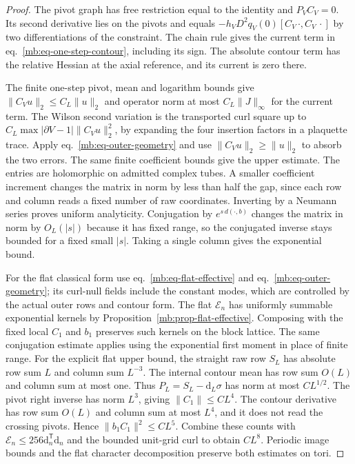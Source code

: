 \documentclass[11pt,letterpaper,reqno]{amsart}
\numberwithin{equation}{section}
\renewcommand{\eqref}[1]{\textup{eq.~\ref{#1}}}
\theoremstyle{definition}
\theoremstyle{remark}
\begin{document}
\begin{proof}
The pivot graph has free restriction equal to the identity and
\(P_V C_V=0\). Its second derivative lies on the pivots and
equals \(-h_VD^2q_V(0)[C_V\,\cdot,C_V\,\cdot]\) by two
differentiations of the constraint. The chain rule gives the
current term in \eqref{mb:eq-one-step-contour}, including its
sign. The absolute contour term has the relative Hessian at
the axial reference, and its current is zero there.

The finite one-step pivot, mean and logarithm bounds give
\(\|C_Vu\|_2\le C_L\|u\|_2\) and operator norm at most
\(C_L\|J\|_\infty\) for the current term. The Wilson second
variation is the transported curl square up to
\(C_L\max|\partial V-1|\|C_Vu\|_2^2\), by expanding the
four insertion factors in a plaquette trace. Apply
\eqref{mb:eq-outer-geometry} and use
\(\|C_Vu\|_2\ge\|u\|_2\) to absorb the two errors. The
same finite coefficient bounds give the upper estimate.
The entries are holomorphic on admitted complex tubes.
A smaller coefficient increment changes the matrix in norm
by less than half the gap, since each row and column reads a
fixed number of raw coordinates. Inverting by a Neumann
series proves uniform analyticity. Conjugation by
\(e^{s\,d(\cdot,b)}\) changes the matrix in norm by \(O_L(|s|)\)
because it has fixed range, so the conjugated inverse stays
bounded for a fixed small \(|s|\). Taking a single column
gives the exponential bound.

For the flat classical form use \eqref{mb:eq-flat-effective}
and \eqref{mb:eq-outer-geometry}; its curl-null fields
include the constant modes, which are controlled by the
actual outer rows and contour form. The flat \(\mathcal E_n\)
has uniformly summable exponential kernels by
Proposition~\ref{mb:prop-flat-effective}. Composing with the
fixed local \(C_1\) and \(b_1\) preserves such kernels on the
block lattice. The same conjugation estimate applies using
the exponential first moment in place of finite range.
For the explicit flat upper bound, the straight raw row
$S_L$ has absolute row sum $L$ and column sum $L^{-3}$.
The internal contour mean has row sum $O(L)$ and column
sum at most one. Thus $P_L=S_L-\mathrm d_L\sigma$
has norm at most $CL^{1/2}$. The pivot right inverse has
norm $L^3$, giving $\|C_1\|\le CL^4$.
The contour derivative has row sum $O(L)$ and column sum
at most $L^4$, and it does not read the crossing pivots.
Hence $\|b_1C_1\|^2\le CL^5$. Combine these counts with
$\mathcal E_n\le256\mathrm d_n^{\mathsf T}\mathrm d_n$
and the bounded unit-grid curl to obtain $CL^8$.
Periodic image bounds and the flat character decomposition
preserve both estimates on tori.
\end{proof}
\end{document}
